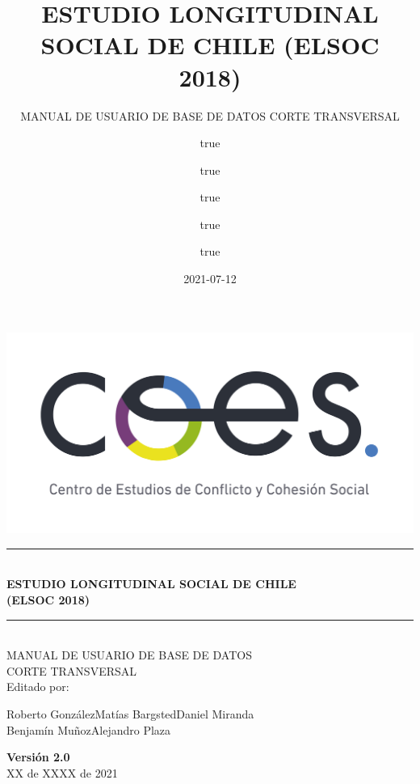 \documentclass[
  openany]{book}
\title{ESTUDIO LONGITUDINAL SOCIAL DE CHILE (ELSOC 2018)}
\subtitle{MANUAL DE USUARIO DE BASE DE DATOS CORTE TRANSVERSAL}
\author{true \and true \and true \and true \and true}
\date{2021-07-12}
\newcommand{\HRule}[1]{\rule{\linewidth}{#1}}
\begin{document}
\maketitle

\begin{titlepage}
	\centering
	\includegraphics[width=16cm]{../Imagenes/coes_blanco_esp.jpg}

\HRule{1.4pt} \\
\LARGE \textbf{\uppercase{Estudio Longitudinal Social de Chile}}\\
\LARGE \textbf{\uppercase{(ELSOC 2018)}}\\

\HRule{1.4pt} \\ [0.2cm]

\normalsize  \vspace*{0.2\baselineskip}
 \large \textsc{MANUAL DE USUARIO DE BASE DE DATOS\\ 	CORTE TRANSVERSAL}
\\ [0.2cm]
\vspace*{0.9cm}
Editado por:\\
\begin{center}
Roberto González\hspace*{1.25cm}Matías Bargsted\hspace*{1.25cm}Daniel Miranda\\
Benjamín Muñoz\hspace*{1.5cm}Alejandro Plaza\\
\end{center}
\vspace*{1.3cm}
\textbf{Versión 2.0}\\
XX de XXXX de  2021\\
\end{titlepage}

\newpage

\thispagestyle{empty}
\begin{minipage}[b]{1\linewidth}
    \tableofcontents
\end{minipage}
\end{document}
